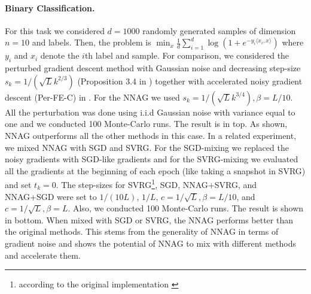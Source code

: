 \documentclass{article}
\theoremstyle{plain}
\theoremstyle{definition}
\theoremstyle{remark}
\begin{document}
\paragraph{Binary Classification.}
For this task we considered \(d=1000\) randomly generated samples of dimension \(n=10\) and labels. Then, the problem is \(\min_x \tfrac{1}{d}\sum_{i=1}^d \log(1+e^{-y_i\langle x_i,x \rangle})\) where \(y_i\) and \(x_i\) denote the \(i\)th label and sample. For comparison, we considered the perturbed gradient descent method with Gaussian noise and decreasing step-size \(s_k=1/(\sqrt{L}k^{2/3})\) (Proposition 3.4 in \citep{pmlr-v108-laborde20a}) together with accelerated noisy gradient descent (Per-FE-C) in \citep{pmlr-v108-laborde20a}. For the NNAG we used \(s_k=1/(\sqrt{L}k^{3/4}),\beta=L/10\). All the perturbation was done using i.i.d Gaussian noise with variance equal to one and we conducted 100 Monte-Carlo runs.  The result is in  top. As shown, NNAG outperforms all the other methods in this case. In a related experiment, we mixed NNAG with SGD and SVRG. For the SGD-mixing we replaced the noisy gradients with SGD-like gradients and for the SVRG-mixing we evaluated all the gradients at the beginning of each epoch (like taking a snapshot in SVRG) and set \(t_k=0\). The step-sizes for SVRG\footnote{according to the original implementation \citep{johnson2013accelerating}}, SGD, NNAG+SVRG, and NNAG+SGD were set to \(1/(10L)\), \(1/L\), \(c=1/\sqrt{L},\beta=L/10\), and \(c=1/\sqrt{L},\beta=L\). Also, we conducted 100 Monte-Carlo runs. The result is shown in  bottom. When mixed with SGD or SVRG, the NNAG performs better than the original methods. This stems from the generality of NNAG in terms of gradient noise and shows the potential of NNAG to mix with different methods and accelerate them.
\end{document}
